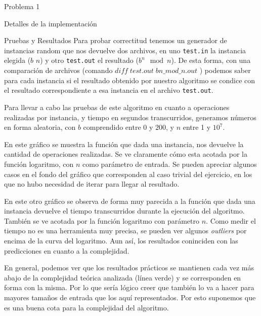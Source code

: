 \begin{section}{Problema 1}
\begin{subsection}{Detalles de la implementación}
	\end{subsection}

	\begin{subsection}{Pruebas y Resultados}
		Para probar correctitud tenemos un generador de instancias random que nos devuelve dos archivos, en uno \texttt{test.in} la instancia elegida ($b$ $n$) y otro \texttt{test.out} el resultado ($b^n \mod n$). De esta forma, con una comparación de archivos (comando $diff\;test.out\;bn\_mod\_n.out$ ) podemos saber para cada instancia si el resultado obtenido por nuestro algoritmo se condice con el resultado correspondiente a esa instancia en el archivo \texttt{test.out}.
		
		Para llevar a cabo las pruebas de este algoritmo en cuanto a operaciones realizadas por instancia, y tiempo en segundos transcurridos, generamos números en forma aleatoria, con $b$ comprendido entre $0$ y $200$, y $n$ entre 1 y $10^7$.\\
		
		\VSP
		
		En este gráfico se muestra la función que dada una instancia, nos devuelve la cantidad de operaciones realizadas. Se ve claramente cómo esta acotada por la función logaritmo, con $n$ como parámetro de entrada. Se pueden apreciar algunos casos en el fondo del gráfico que co\-rres\-pon\-den al caso trivial del ejercicio, en los que no hubo necesidad de iterar para llegar al resultado.

		\VSP

		En este otro gráfico se observa de forma muy parecida a la función que dada una instancia devuelve el tiempo transcurridos durante la ejecución del algoritmo. También se ve acotada por la función logaritmo con parámetro $n$. Como medir el tiempo no es una herramienta muy precisa, se pueden ver algunos {\em outliers} por encima de la curva del logaritmo. Aun así, los resultados coninciden con las predicciones en cuanto a la complejidad.\Pa

		En general, podemos ver que los resultados prácticos se mantienen cada vez más abajo de la complejidad teórica analizada (línea verde) y se corresponden en forma con la misma. Por lo que sería lógico creer que también lo va a hacer para mayores tamaños de entrada que los aquí representados.
		Por esto suponemos que es una buena cota para la complejidad del algoritmo.
	\end{subsection}

\end{section}

